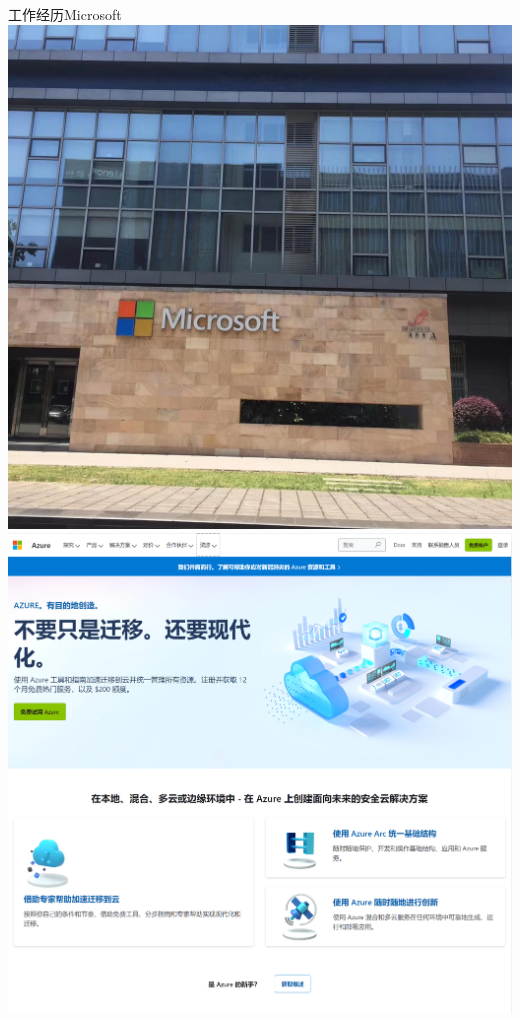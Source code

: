\documentclass[xcolor=svgnames, t, aspectratio=169]{ctexbeamer}
\begin{document}
\begin{frame}{工作经历}{Microsoft}
  \includegraphics[scale=0.14,trim=0 0 0 120,clip]{microsoft_css.jpg}
  \includegraphics[scale=0.2]{azure.png} 
\end{frame}
\end{document}
